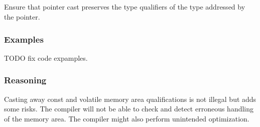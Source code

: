 \subsection*{\myRule{}}

Ensure that pointer cast preserves the type qualifiers of the type addressed by the pointer.

\subsubsection*{Examples}

TODO fix code expamples.

\begin{minipage}[t]{0.47\linewidth}
    
\end{minipage}
\hfill
\begin{minipage}[t]{0.47\linewidth}
    
\end{minipage}

\subsubsection*{Reasoning}

Casting away const and volatile memory area qualifications is not illegal but adds some risks. The compiler will not be able to check and detect erroneous handling of the memory area. The compiler might also perform unintended optimization.

